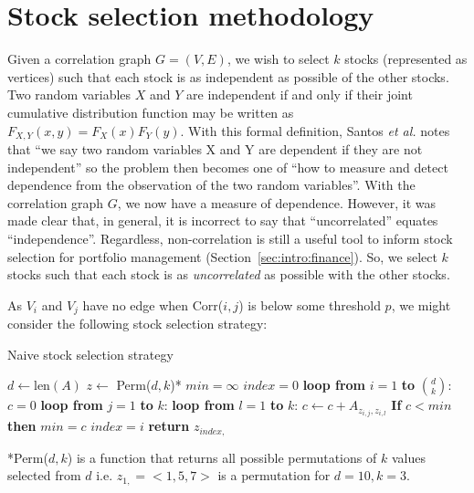 \section{Stock selection methodology}
\label{sec:usage:stockselection}

Given a correlation graph $G=(V,E)$, we wish to select $k$ stocks (represented 
as vertices) such that each stock is as independent as possible of the other 
stocks. Two random variables $X$ and $Y$ are independent if and only if their 
joint cumulative distribution function may be written as 
$F_{X,Y}(x,y)=F_X(x)F_Y(y)$. With this formal definition, Santos \textit{et 
al.} notes that ``we say two random variables X and Y are dependent if they
are not independent'' so the problem then becomes one of ``how to measure and 
detect dependence from the observation of the two random 
variables''\cite{santos2013}. With the correlation graph $G$, we now have 
a measure of dependence. However, it was made clear that, in general, 
it is incorrect to say that ``uncorrelated'' equates ``independence''. 
Regardless, non-correlation is still a useful tool to inform stock selection 
for portfolio management (Section~\ref{sec:intro:finance}). So, we select $k$ 
stocks such that each stock is as \textit{uncorrelated} as possible with the 
other stocks.

As $V_i$ and $V_j$ have no edge when Corr($i,j$) is below some threshold $p$, 
we might consider the following stock selection strategy:

\tablespacing
\begin{algorithm}[H]
	\caption{Naive stock selection strategy}\label{euclid}
	\begin{algorithmic}[1]
		\State $d \gets \text{len}(A)$
		\State $z \gets$ Perm($d,k$)*
		\State $min = \infty$
		\State $index = 0$
		\State \textbf{loop from} $i=1$ \textbf{to} $d \choose k$:
		\State \indent $c = 0$
		\State \indent \textbf{loop from} $j = 1$ \textbf{to} $k$:
		\State \indent \indent \textbf{loop from} $l=1$ \textbf{to} $k$:
		\State \indent \indent \indent $c \gets c+A_{z_{i,j},z_{i,l}}$
		\State \indent \textbf{If} $c < min$ \textbf{then}
		\State \indent \indent $min = c$
		\State \indent \indent $index = i$
		\State \textbf{return} $z_{index,}$
		\EndProcedure
	\end{algorithmic}
	*Perm($d,k$) is a function that returns all possible permutations 
	of $k$ values selected from $d$ i.e. $z_{1,}=<1,5,7>$ is a permutation for 
	$d=10,k=3$.
\end{algorithm}
\bodyspacing

